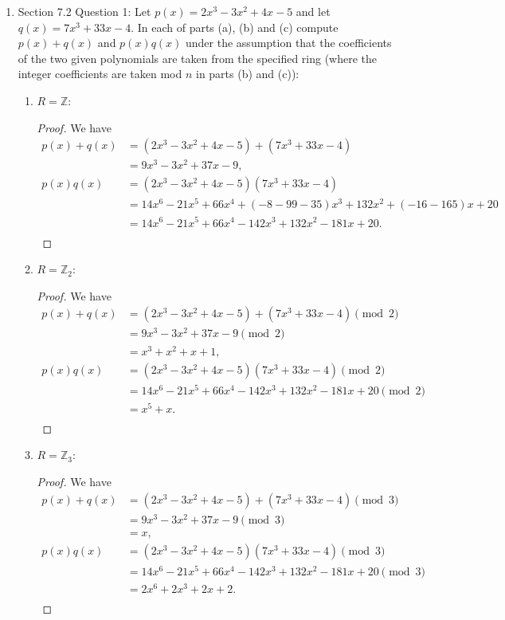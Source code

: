 \documentclass{article}
\begin{document}
\begin{enumerate}[label={\bf Q\arabic*:}]
  \item Section 7.2 Question 1: Let $p(x)=2x^3-3x^2+4x-5$ and let
    $q(x)=7x^3+33x-4$. In each of parts (a), (b) and (c) compute
    $p(x)+q(x)$ and $p(x)q(x)$ under the assumption that the coefficients
    of the two given polynomials are taken from the specified ring (where
    the integer coefficients are taken mod $n$ in parts (b) and (c)):

    \begin{enumerate}
      \item $R=\mathbb{Z}$:
        \begin{proof}
          We have
          \begin{align*}
            p(x)+q(x) &= (2x^3-3x^2+4x-5)+(7x^3+33x-4) \\
                      &= 9x^3-3x^2+37x-9, \\
            p(x)q(x)  &= (2x^3-3x^2+4x-5)(7x^3+33x-4) \\
              &= 14x^6-21x^5+66x^4+(-8-99-35)x^3+132x^2+(-16-165)x+20 \\
              &= 14x^6-21x^5+66x^4-142x^3+132x^2-181x+20. \\
          \end{align*}
        \end{proof}

      \item $R=\mathbb{Z}_2$:
        \begin{proof}
          We have
          \begin{align*}
            p(x)+q(x) &= (2x^3-3x^2+4x-5)+(7x^3+33x-4)\pmod{2} \\
                      &= 9x^3-3x^2+37x-9\pmod{2} \\
                      &= x^3+x^2+x+1, \\
            p(x)q(x)  &= (2x^3-3x^2+4x-5)(7x^3+33x-4)\pmod{2} \\
              &= 14x^6-21x^5+66x^4-142x^3+132x^2-181x+20\pmod{2} \\
              &= x^5+x. \\
          \end{align*}
        \end{proof}

      \item $R=\mathbb{Z}_3$:
        \begin{proof}
          We have
          \begin{align*}
            p(x)+q(x) &= (2x^3-3x^2+4x-5)+(7x^3+33x-4)\pmod{3} \\
                      &= 9x^3-3x^2+37x-9\pmod{3} \\
                      &= x, \\
            p(x)q(x)  &= (2x^3-3x^2+4x-5)(7x^3+33x-4)\pmod{3} \\
              &= 14x^6-21x^5+66x^4-142x^3+132x^2-181x+20\pmod{3} \\
              &= 2x^6+2x^3+2x+2. \\
          \end{align*}
        \end{proof}
    \end{enumerate}


\end{enumerate}
\end{document}
